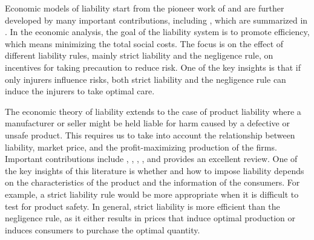 \label{sec:background}



Economic models of liability start from the pioneer work of \cite{brown1973toward} and are further developed by many important contributions, including \cite{shavell1980strict}, which are summarized in \cite{shavell2009accident}. 
In the economic analysis, the goal of the liability system is to promote efficiency, which means minimizing the total social costs.  
The focus is on the effect of different liability rules, mainly strict liability and the negligence rule, on incentives for taking precaution to reduce risk. 
One of the key insights is that if only injurers influence risks, both strict liability and the negligence rule can induce the injurers to take optimal care.  

The economic theory of liability extends to the case of product liability where a manufacturer or seller might be held liable for harm caused by a defective or unsafe product. 
This requires us to take into account the relationship between liability, market price, and the profit-maximizing production of the firms. 
Important contributions include \cite{hamada1976liability}, \cite{polinsky1980strict}, \cite{landes1985positive}, \cite{polinsky2010uneasy}, and \cite{daughety2013economic} provides an excellent review. 
One of the key insights of this literature is whether and how to impose liability depends on the characteristics of the product and the information of the consumers.  
For example, a strict liability rule would be more appropriate when it is difficult to test for product safety.
In general, strict liability is more efficient than the negligence rule, as it either results in prices that induce optimal production or induces consumers to purchase the optimal quantity. 

